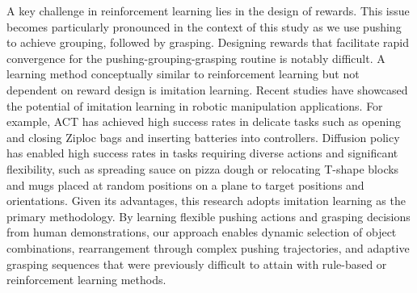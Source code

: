 A key challenge in reinforcement learning lies in the design of rewards. This issue becomes particularly pronounced in the context of this study as we use pushing to achieve grouping, followed by grasping. Designing rewards that facilitate rapid convergence for the pushing-grouping-grasping routine is notably difficult. A learning method conceptually similar to reinforcement learning but not dependent on reward design is imitation learning. Recent studies have showcased the potential of imitation learning in robotic manipulation applications. For example, ACT \cite{zhao2023learning} has achieved high success rates in delicate tasks such as opening and closing Ziploc bags and inserting batteries into controllers. Diffusion policy \cite{chi2023diffusion} has enabled high success rates in tasks requiring diverse actions and significant flexibility, such as spreading sauce on pizza dough or relocating T-shape blocks and mugs placed at random positions on a plane to target positions and orientations. Given its advantages, this research adopts imitation learning as the primary methodology. By learning flexible pushing actions and grasping decisions from human demonstrations, our approach enables dynamic selection of object combinations, rearrangement through complex pushing trajectories, and adaptive grasping sequences that were previously difficult to attain with rule-based or reinforcement learning methods.